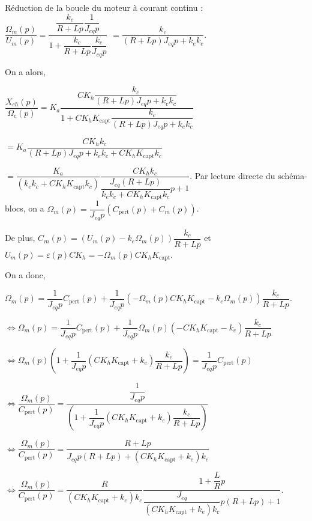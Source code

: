 \begin{corrigebox}
Réduction de la boucle du moteur à courant continu : 
$\dfrac{\Omega_m(p)}{U_m(p)}=\dfrac{\dfrac{k_c}{R+Lp}\dfrac{1}{J_{eq}p}}{1+\dfrac{k_c}{R+Lp}\dfrac{k_e}{J_{eq}p}}$
$=\dfrac{k_c}{\left(R+Lp\right)J_{eq}p+k_ek_c}$.

On a alors, 

$
\dfrac{X_{ch}(p)}{\Omega_c(p)} =
K_a  \dfrac{CK_h \dfrac{k_c}{\left(R+Lp\right)J_{eq}p+k_ek_c}}{1+CK_hK_{\text{capt}} \dfrac{k_c}{\left(R+Lp\right)J_{eq}p+k_ek_c}}
$ 

$
=
K_a \dfrac{CK_h k_c}{\left(R+Lp\right)J_{eq}p+k_ek_c+CK_hK_{\text{capt}} k_c}
$

$
=
\dfrac{K_a }{\left( k_ek_c+CK_hK_{\text{capt}} k_c\right)} \dfrac{CK_h k_c}{\dfrac{J_{eq}\left(R+Lp\right)}{k_ek_c+CK_hK_{\text{capt}} k_c}p+1}
$.
Par lecture directe du schéma-blocs, on a 
$\Omega_m(p) = \dfrac{1}{J_{eq}p}\left(C_{\text{pert}}(p) + C_m(p)\right)$.

De plus, 
$C_m(p) = \left(U_m(p)-k_e\Omega_m(p)\right) \dfrac{k_c}{R+Lp}$
 et $U_m(p)=\varepsilon(p) C K_h = -\Omega_m(p) C K_h K_{\text{capt}}$.
 
 On a donc, 
 
 $\Omega_m(p) = \dfrac{1}{J_{eq}p} C_{\text{pert}}(p) 
 + \dfrac{1}{J_{eq}p} \left(-\Omega_m(p) C K_h K_{\text{capt}}-k_e\Omega_m(p)\right) \dfrac{k_c}{R+Lp}$.

$\Leftrightarrow 
\Omega_m(p) = \dfrac{1}{J_{eq}p} C_{\text{pert}}(p) 
 + \dfrac{1}{J_{eq}p} \Omega_m(p) \left(- C K_h K_{\text{capt}}-k_e\right) \dfrac{k_c}{R+Lp}$
 
 $\Leftrightarrow 
\Omega_m(p)\left(1+\dfrac{1}{J_{eq}p} \left( C K_h K_{\text{capt}}+k_e\right) \dfrac{k_c}{R+Lp}\right)= \dfrac{1}{J_{eq}p} C_{\text{pert}}(p) 
 $

$\Leftrightarrow 
\dfrac{\Omega_m(p)}{C_{\text{pert}}(p)}
 = \dfrac{\dfrac{1}{J_{eq}p}}{\left(1+\dfrac{1}{J_{eq}p} \left( C K_h K_{\text{capt}}+k_e\right) \dfrac{k_c}{R+Lp}\right)}
 $

$\Leftrightarrow 
\dfrac{\Omega_m(p)}{C_{\text{pert}}(p)}
 = \dfrac{R+Lp}{J_{eq}p\left(R+Lp\right)+ \left( C K_h K_{\text{capt}}+k_e\right) k_c}
 $

$\Leftrightarrow 
\dfrac{\Omega_m(p)}{C_{\text{pert}}(p)}
 = \dfrac{R}{\left( C K_h K_{\text{capt}}+k_e\right) k_c} \dfrac{1+\dfrac{L}{R}p}{\dfrac{J_{eq}}{\left( C K_h K_{\text{capt}}+k_e\right) k_c}p\left(R+Lp\right)+ 1}
 $.
 

\end{corrigebox}
